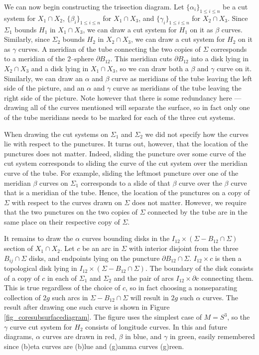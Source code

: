 \documentclass[12pt]{amsart}
\newcommand{\del}{\partial }
\theoremstyle{definition}
\theoremstyle{remark}
\begin{document}
We can now begin constructing the trisection diagram.
Let $\{\alpha_i\}_{1 \le i \le n}$ be a cut system for $X_1 \cap X_2$, $\{\beta_i\}_{1 \le i \le n}$ for $X_1 \cap X_3$, and $\{\gamma_i\}_{1 \le i \le n}$ for $X_2 \cap X_3$.
Since $\Sigma_1$ bounds $H_1$ in $X_1 \cap X_3$, we can draw a cut system for $H_1$ on it as $\beta$ curves.
Similarly, since $\Sigma_2$ bounds $H_2$ in $X_2 \cap X_3$, we can draw a cut system for $H_2$ on it as $\gamma$ curves.
A meridian of the tube connecting the two copies of $\Sigma$ corresponds to a meridian of the 2--sphere $\del B_{12}$.
This meridian cuts $\del B_{12}$ into a disk lying in $X_2 \cap X_3$ and a disk lying in $X_1 \cap X_3$, so we can draw both a $\beta$ and $\gamma$ curve on it.
Similarly, we can draw an $\alpha$ and $\beta$ curve as meridians of the tube leaving the left side of the picture, and an $\alpha$ and $\gamma$ curve as meridians of the tube leaving the right side of the picture.
Note however that there is some redundancy here --- drawing all of the curves mentioned will separate the surface, so in fact only one of the tube meridians needs to be marked for each of the three cut systems.

When drawing the cut systems on $\Sigma_1$ and $\Sigma_2$ we did not specify how the curves lie with respect to the punctures.
It turns out, however, that the location of the punctures does not matter.
Indeed, sliding the puncture over some curve of the cut system corresponds to sliding the curve of the cut system over the meridian curve of the tube.
For example, sliding the leftmost puncture over one of the meridian $\beta$ curves on $\Sigma_1$ corresponds to a slide of that $\beta$ curve over the $\beta$ curve that is a meridian of the tube.
Hence, the location of the punctures on a copy of $\Sigma$ with respect to the curves drawn on $\Sigma$ does not matter.
However, we require that the two punctures on the two copies of $\Sigma$ connected by the tube are in the same place on their respective copy of $\Sigma$.


It remains to draw the $\alpha$ curves bounding disks in the $I_{12} \times (\Sigma - B_{12} \cap \Sigma)$ section of $X_1 \cap X_2$.
 Let $c$ be an arc in $\Sigma$ with interior disjoint from the three $B_{ij} \cap \Sigma$ disks, and endpoints lying on the puncture $\del B_{12} \cap \Sigma$.
$I_{12} \times c$ is then a topological disk lying in $I_{12} \times (\Sigma - B_{12} \cap \Sigma)$.
The boundary of the disk consists of a copy of $c$ in each of $\Sigma_1$ and $\Sigma_2$ and the pair of arcs $I_{12} \times \del c$ connecting them.
This is true regardless of the choice of $c$, so in fact choosing a nonseparating collection of $2g$ such arcs in $\Sigma - B_{12} \cap \Sigma$ will result in $2g$ such $\alpha$ curves.
The result after drawing one such curve is shown in Figure \ref{fig_coresubsurfacediagram}.
The figure uses the simplest case of $M = S^3$, so the $\gamma$ curve cut system for $H_2$ consists of longitude curves.
In this and future diagrams, $\alpha$ curves are drawn in red, $\beta$ in blue, and $\gamma$ in green, easily remembered since (b)eta curves are (b)lue and (g)amma curves (g)reen.
\end{document}
